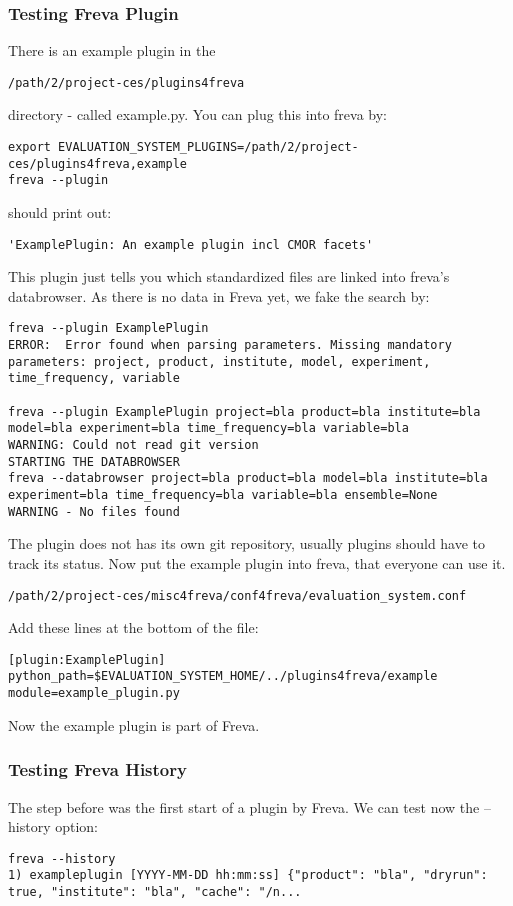 \documentclass[a4paper,11pt]{ltxdoc}
\begin{document}
\subsubsection{Testing Freva Plugin}
There is an example plugin in the 
\begin{lstlisting}
/path/2/project-ces/plugins4freva \end{lstlisting}
directory - called example.py. You can plug this into freva by:
\begin{lstlisting}
export EVALUATION_SYSTEM_PLUGINS=/path/2/project-ces/plugins4freva,example
freva --plugin\end{lstlisting}
should print out:
\begin{lstlisting}
'ExamplePlugin: An example plugin incl CMOR facets'\end{lstlisting}
This plugin just tells you which standardized files are linked into freva's databrowser. As there is no data in Freva yet, we fake the search by:
\begin{lstlisting}
freva --plugin ExamplePlugin
ERROR:  Error found when parsing parameters. Missing mandatory parameters: project, product, institute, model, experiment, time_frequency, variable

freva --plugin ExamplePlugin project=bla product=bla institute=bla model=bla experiment=bla time_frequency=bla variable=bla
WARNING: Could not read git version
STARTING THE DATABROWSER
freva --databrowser project=bla product=bla model=bla institute=bla experiment=bla time_frequency=bla variable=bla ensemble=None
WARNING - No files found
\end{lstlisting}
The plugin does not has its own git repository, usually plugins should have to track its status. Now put the example plugin into freva, that everyone can use it.
\begin{lstlisting}
/path/2/project-ces/misc4freva/conf4freva/evaluation_system.conf \end{lstlisting}
Add these lines at the bottom of the file:
\begin{lstlisting}
[plugin:ExamplePlugin]
python_path=$EVALUATION_SYSTEM_HOME/../plugins4freva/example
module=example_plugin.py\end{lstlisting}
Now the example plugin is part of Freva.
\subsubsection{Testing Freva History}
The step before was the first start of a plugin by Freva. We can test now the --history option:
\begin{lstlisting}
freva --history
1) exampleplugin [YYYY-MM-DD hh:mm:ss] {"product": "bla", "dryrun": true, "institute": "bla", "cache": "/n...\end{lstlisting}
\end{document}
